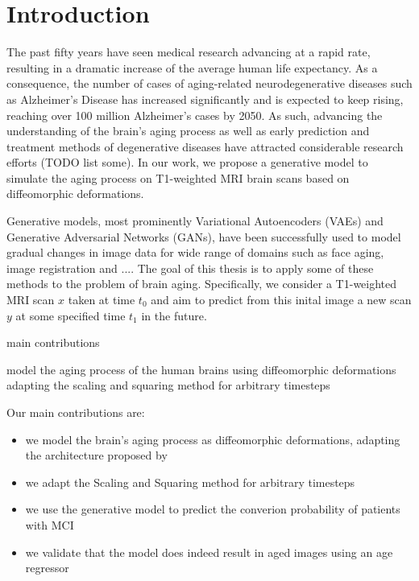 \chapter{Introduction}




The past fifty years have seen medical research advancing at a rapid rate, resulting in a dramatic increase of the average human life expectancy. As a consequence, the number of cases of aging-related neurodegenerative diseases such as Alzheimer's Disease has increased significantly and is expected to keep rising, reaching over 100 million Alzheimer's cases by 2050. As such, advancing the understanding of the brain's aging process as well as early prediction and treatment methods of degenerative diseases have attracted considerable research efforts (TODO list some). In our work, we propose a generative model to simulate the aging process on T1-weighted MRI brain scans based on diffeomorphic deformations.

 

Generative models, most prominently Variational Autoencoders (VAEs) and Generative Adversarial Networks (GANs), have been successfully used to model gradual changes in image data for wide range of domains such as face aging, image registration and .... The goal of this thesis is to apply some of these methods to the problem of brain aging. Specifically, we consider a T1-weighted MRI scan $x$ taken at time $t_0$ and aim to predict from this inital image a new scan $y$ at some specified time $t_1$ in the future. 





main contributions

model the aging process of the human brains using diffeomorphic deformations
adapting the scaling and squaring method for arbitrary timesteps

Our main contributions are:

\begin{itemize}
	\item we model the brain's aging process as diffeomorphic deformations, adapting the architecture proposed by \cite{voxelmorph}
	\item we adapt the Scaling and Squaring method for arbitrary timesteps

	\item we use the generative model to predict the converion probability of patients with MCI

	\item we validate that the model does indeed result in aged images using an age regressor


\end{itemize}
